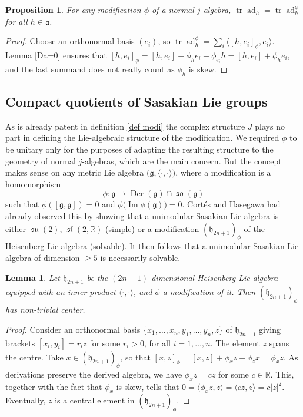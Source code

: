 \documentclass[12pt, twoside]{amsart}
\def\g{\mathfrak{g}}
\def\h{\mathfrak{h}}
\def\a{\mathfrak{a}}
\def\R{\mathbb{R}}
\def\ad{\operatorname{ad}}
\renewcommand{\Im}{\operatorname{Im}}
\renewcommand{\geq}{\geqslant}\renewcommand{\leq}{\leqslant}
\newcommand{\lie}[1]{\mathfrak{#1}}
\DeclareMathOperator{\slie}{\lie{sl}}
\DeclareMathOperator{\so}{\lie{so}}
\DeclareMathOperator{\su}{\lie{su}}
\def\pint{\langle \cdotp,\cdotp \rangle }
\def\tr{\operatorname{tr}}
\newcommand{\op}[1]{\operatorname{#1}}
\newtheorem{prop}[definition]{Proposition}
\newtheorem{lemma}[definition]{Lemma}
\theoremstyle{definition}
\begin{document}
\begin{prop} 
For any modification $\phi$ of a normal $j$-algebra, $ \tr \ad_{h}=\tr \ad ^{\phi}_{h}$ for all $h \in \a$.
\end{prop}

\begin{proof} Choose an orthonormal basis $(e_i)$, so $\tr\ad_{h}^{\phi} =\sum_i  \langle [h,e_i]_{\phi},e_i \rangle$. Lemma \ref{Da=0} ensures that $[h,e_i]_{\phi}=[h,e_i]+\phi_h e_i - \phi_{e_i}h=[h,e_i]+ \phi_h e_i$, 
and the last summand does not really count as $\phi_h$ is skew. 
\end{proof}


\subsection{Compact quotients of Sasakian Lie groups}

As is already patent in definition \ref{def modi} the complex structure $J$ plays no part in defining the Lie-algebraic structure of the modification. We required $\phi$ to be unitary only for the purposes of adapting the resulting structure to the geometry of normal $j$-algebras, which are the main concern. But the concept makes sense on any metric Lie algebra $\big(\g, \pint\big)$, where a modification is a homomorphism
 \[\phi\colon\g \longrightarrow \op{Der}(\g) \cap\so(\g)\]
 such that $\phi ([\g,\g])=0$ and $\phi\big(\Im \phi(\g)\big)=0$.
Cort{\'e}s and Hasegawa  \cite{Cortes} had already observed this by showing 
that a unimodular Sasakian Lie algebra is either $\su(2)$, 
 $\slie(2,\R)$ (simple) or a modification $(\h_{2n+1})_{\phi}$ of the Heisenberg Lie algebra (solvable). It then follows that a unimodular Sasakian Lie algebra of dimension $\geq 5$ is necessarily solvable. 

\begin{lemma}
Let $\h_{2n+1}$ be the $(2n+1)$-dimensional Heisenberg Lie algebra equipped with an inner product $\pint$, and $\phi$ a modification of it. Then $(\h_{2n+1})_{\phi}$ has non-trivial center. 
\end{lemma}

\begin{proof}
Consider an orthonormal basis $\{x_1, \ldots,  x_n, y_1, \ldots,  y_n, z \}$ of $\h_{2n+1}$ giving  brackets $[x_i, y_i]=r_i z$ 
for some $r_i>0$, for all $i=1,\ldots,  n$. The element $z$ spans the centre. 
Take $x \in (\h_{2n+1})_{\phi}$, so that $[x,z]_{\phi}=[x,z]+\phi_x z-\phi_z x = \phi_x z$.  
As derivations preserve the derived algebra, we have $\phi_x z=c z$ for some $c\in \R$. This, together with the fact that $\phi_x $ is skew, tells that 
$0=\langle \phi_x z, z\rangle=\langle cz, z \rangle = c\vert z \vert ^{2}$.
Eventually, $z$ is a central element in $(\h_{2n+1})_{\phi}$.
\end{proof}
\end{document}
